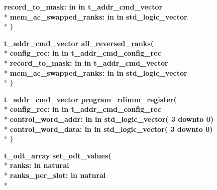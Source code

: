 \begin{DoxyCompactItemize}
{\bfseries \textcolor{vhdlchar}{record\+\_\+to\+\_\+mask\+: }\textcolor{stringliteral}{in }\textcolor{vhdlchar}{in t\+\_\+addr\+\_\+cmd\+\_\+vector}}\\*
{\bfseries \textcolor{vhdlchar}{mem\+\_\+ac\+\_\+swapped\+\_\+ranks\+: }\textcolor{stringliteral}{in }\textcolor{vhdlchar}{in std\+\_\+logic\+\_\+vector}}\\*
{\bfseries  )} 
\item 
{\bfseries {\bfseries {\bfseries {\bf t\+\_\+addr\+\_\+cmd\+\_\+vector}} \textcolor{vhdlchar}{ }}} {\bf all\+\_\+reversed\+\_\+ranks}{\bfseries  ( }\\*
{\bfseries \textcolor{vhdlchar}{config\+\_\+rec\+: }\textcolor{stringliteral}{in }\textcolor{vhdlchar}{in t\+\_\+addr\+\_\+cmd\+\_\+config\+\_\+rec}}\\*
{\bfseries \textcolor{vhdlchar}{record\+\_\+to\+\_\+mask\+: }\textcolor{stringliteral}{in }\textcolor{vhdlchar}{in t\+\_\+addr\+\_\+cmd\+\_\+vector}}\\*
{\bfseries \textcolor{vhdlchar}{mem\+\_\+ac\+\_\+swapped\+\_\+ranks\+: }\textcolor{stringliteral}{in }\textcolor{vhdlchar}{in std\+\_\+logic\+\_\+vector}}\\*
{\bfseries  )} 
\item 
{\bfseries {\bfseries {\bfseries {\bf t\+\_\+addr\+\_\+cmd\+\_\+vector}} \textcolor{vhdlchar}{ }}} {\bf program\+\_\+rdimm\+\_\+register}{\bfseries  ( }\\*
{\bfseries \textcolor{vhdlchar}{config\+\_\+rec\+: }\textcolor{stringliteral}{in }\textcolor{vhdlchar}{in t\+\_\+addr\+\_\+cmd\+\_\+config\+\_\+rec}}\\*
{\bfseries \textcolor{vhdlchar}{control\+\_\+word\+\_\+addr\+: }\textcolor{stringliteral}{in }\textcolor{vhdlchar}{in std\+\_\+logic\+\_\+vector( 3 downto  0)}}\\*
{\bfseries \textcolor{vhdlchar}{control\+\_\+word\+\_\+data\+: }\textcolor{stringliteral}{in }\textcolor{vhdlchar}{in std\+\_\+logic\+\_\+vector( 3 downto  0)}}\\*
{\bfseries  )} 
\item 
{\bfseries {\bfseries {\bfseries {\bf t\+\_\+odt\+\_\+array}} \textcolor{vhdlchar}{ }}} {\bf set\+\_\+odt\+\_\+values}{\bfseries  ( }\\*
{\bfseries \textcolor{vhdlchar}{ranks\+: }\textcolor{stringliteral}{in }{\bfseries \textcolor{comment}{natural}\textcolor{vhdlchar}{ }}}\\*
{\bfseries \textcolor{vhdlchar}{ranks\+\_\+per\+\_\+slot\+: }\textcolor{stringliteral}{in }{\bfseries \textcolor{comment}{natural}\textcolor{vhdlchar}{ }}}\\*

\end{DoxyCompactItemize}
